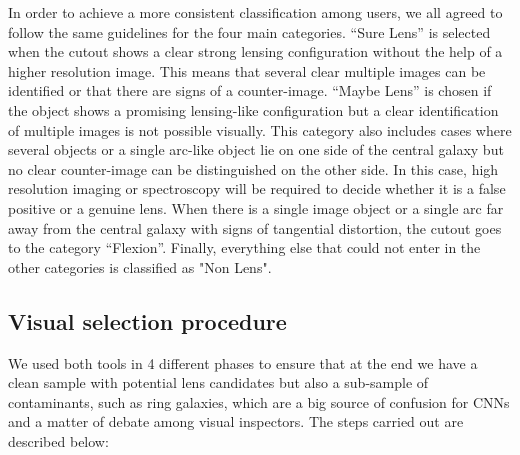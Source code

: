 \documentclass[tradiabstract,twocolumn]{aa}
\begin{document}
In order to achieve a more consistent classification among users, we all agreed to follow the same guidelines for the four main categories. “Sure Lens” is selected when the cutout shows a clear strong lensing configuration without the help of a higher resolution image. This means that several clear multiple images can be identified or that there are signs of a counter-image. “Maybe Lens” is chosen if the object shows a promising lensing-like configuration but a clear identification of multiple images is not possible visually. This category also includes cases where several objects or a single arc-like object lie on one side of the central galaxy but no clear counter-image can be distinguished on the other side. In this case, high resolution imaging or spectroscopy will be required to decide whether it is a false positive or a genuine lens. When there is a single image object or a single arc far away from the central galaxy with signs of tangential distortion, the cutout goes to the category “Flexion”. Finally, everything else that could not enter in the other categories is classified as "Non Lens".



\subsection{Visual selection procedure}\label{subsec:vis_procedure}

We used both tools in 4 different phases to ensure that at the end we have a clean sample with potential lens candidates but also a sub-sample of contaminants, such as ring galaxies, which are a big source of confusion for CNNs and a matter of debate among visual inspectors. The steps carried out are described below:
\end{document}
